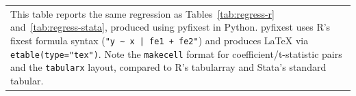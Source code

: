 \documentclass[english,12pt]{article}
\begin{document}
\begin{table}[htbp]
{\vspace{-1.5\baselineskip}
\singlespace
\flushleft
\begin{tabular}{@{}p{\linewidth}@{}}
\footnotesize
This table reports the same regression as Tables~\ref{tab:regress-r} and~\ref{tab:regress-stata}, produced using pyfixest in Python. pyfixest uses R's fixest formula syntax (\texttt{"y \textasciitilde\ x | fe1 + fe2"}) and produces LaTeX via \texttt{etable(type="tex")}. Note the \texttt{makecell} format for coefficient/t-statistic pairs and the \texttt{tabularx} layout, compared to R's tabularray and Stata's standard tabular.
\end{tabular}
}
\end{table}


\clearpage\newpage

\end{document}

